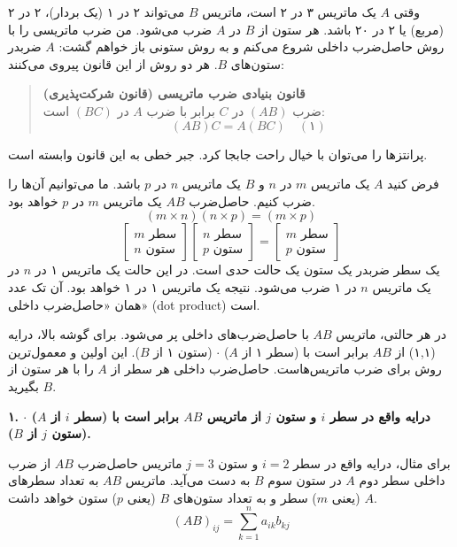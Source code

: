 \documentclass[12pt, a4paper]{book}
\begin{document}
	وقتی $A$ یک ماتریس ۳ در ۲ است، ماتریس $B$ می‌تواند ۲ در ۱ (یک بردار)، ۲ در ۲ (مربع) یا ۲ در ۲۰ باشد. هر ستون از $B$ در $A$ ضرب می‌شود. من ضرب ماتریسی را با روش حاصل‌ضرب داخلی شروع می‌کنم و به روش ستونی باز خواهم گشت: $A$ ضربدر ستون‌های $B$. هر دو روش از این قانون پیروی می‌کنند:
	
	\begin{quote}
		\textbf{قانون بنیادی ضرب ماتریسی (قانون شرکت‌پذیری)} \\
		ضرب $(AB)$ در $C$ برابر با ضرب $A$ در $(BC)$ است:
		\[ (AB)C = A(BC) \quad (۱) \]
	\end{quote}
	پرانتزها را می‌توان با خیال راحت جابجا کرد. جبر خطی به این قانون وابسته است.
	
	فرض کنید $A$ یک ماتریس $m$ در $n$ و $B$ یک ماتریس $n$ در $p$ باشد. ما می‌توانیم آن‌ها را ضرب کنیم. حاصل‌ضرب $AB$ یک ماتریس $m$ در $p$ خواهد بود.
	\[ (m \times n)(n \times p) = (m \times p) \]
	\[
	\begin{bmatrix} m \text{ سطر} \\ n \text{ ستون} \end{bmatrix}
	\begin{bmatrix} n \text{ سطر} \\ p \text{ ستون} \end{bmatrix}
	=
	\begin{bmatrix} m \text{ سطر} \\ p \text{ ستون} \end{bmatrix}
	\]
	یک سطر ضربدر یک ستون یک حالت حدی است. در این حالت یک ماتریس ۱ در $n$ در یک ماتریس $n$ در ۱ ضرب می‌شود. نتیجه یک ماتریس ۱ در ۱ خواهد بود. آن تک عدد همان «حاصل‌ضرب داخلی» (dot product) است.
	
	در هر حالتی، ماتریس $AB$ با حاصل‌ضرب‌های داخلی پر می‌شود. برای گوشه بالا، درایه (۱,۱) از $AB$ برابر است با (سطر ۱ از $A$) $\cdot$ (ستون ۱ از $B$). این اولین و معمول‌ترین روش برای ضرب ماتریس‌هاست. حاصل‌ضرب داخلی هر سطر از $A$ را با هر ستون از $B$ بگیرید.
	
	\textbf{۱. درایه واقع در سطر $i$ و ستون $j$ از ماتریس $AB$ برابر است با (سطر $i$ از $A$) $\cdot$ (ستون $j$ از $B$).}
	
	برای مثال، درایه واقع در سطر $i=2$ و ستون $j=3$ ماتریس حاصل‌ضرب $AB$ از ضرب داخلی سطر دوم $A$ در ستون سوم $B$ به دست می‌آید. ماتریس $AB$ به تعداد سطرهای $A$ (یعنی $m$) سطر و به تعداد ستون‌های $B$ (یعنی $p$) ستون خواهد داشت.
	\[ (AB)_{ij} = \sum_{k=1}^{n} a_{ik}b_{kj} \]
	
\end{document}
